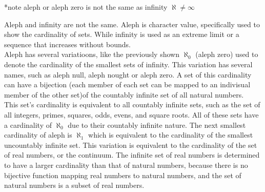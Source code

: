 \documentclass{article}
\begin{document}
\begin{large}
\begin{center}
  *note aleph or aleph zero is not the same as infinity
  $ \aleph  \neq \infty $
  \\
\end{center}
Aleph and infinity are not the same.
Aleph is character value, specifically used to show the cardinality of sets.
While infinity is used as an extreme limit or a sequence that increases without bounds.
\\


     Aleph has several variatioons, like the previously shown $ \aleph_0$ (aleph zero) used to denote the cardinality of the smallest sets of infinity.
This variation has several names, such as aleph null, aleph nought or aleph zero.
A set of this cardinality can have a bijection (each member of each set can be mapped to an indivisual member of the other set)of the countably infinite set of all natural numbers.
\\

This set's cardinality is equivalent to all countably infinite sets, such as the set of all integers, primes, squares, odds, evens, and square roots.
All of these sets have a cardinality of $ \aleph_0$ due to their countably infinite nature.
The next smallest cardinality of aleph is $ \aleph_1$ which is equivalent to the cardinality of the smallest uncountably infinite set.
This variation is equivalent to the cardinality of the set of real numbers, or the continuum.
The infinite set of real numbers is determined to have a larger cardinality than that of natural numbers, because there is no bijective function mapping real numbers to natural numbers, and the set of natural numbers is a subset of real numbers.
\\



\end{large}
\end{document}
